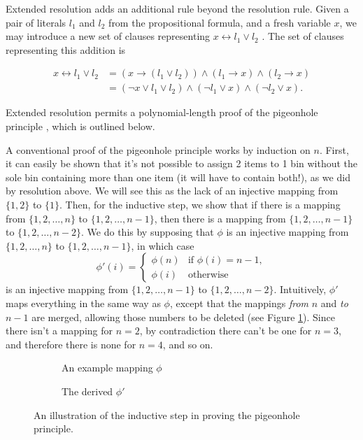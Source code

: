 \documentclass[proof,pdftex,11pt,a4,titlepage]{article}
\begin{document}
Extended resolution adds an additional rule beyond the resolution rule. Given a pair of literals $l_1$ and $l_2$ from the propositional formula, and a fresh variable $x$, we may introduce a new set of clauses representing $x \leftrightarrow l_1 \vee l_2$ \cite{Tseitin:1983}. The set of clauses representing this addition is

\begin{equation*}
  \begin{align*}
    x \leftrightarrow l_1 \vee l_2 &= (x \to (l_1 \vee l_2)) \wedge (l_1 \to x) \wedge (l_2 \to x) \\
          &= (\neg x \vee l_1 \vee l_2) \wedge (\neg l_1 \vee x) \wedge (\neg l_2 \vee x).
  \end{align*}
\end{equation*}

Extended resolution permits a polynomial-length proof of the pigeonhole principle \cite{Cook:1976}, which is outlined below.

A conventional proof of the pigeonhole principle works by induction on $n$. First, it can easily be shown that it's not possible to assign 2 items to 1 bin without the sole bin containing more than one item (it will have to contain both!), as we did by resolution above. We will see this as the lack of an injective mapping from $\{1,2\}$ to $\{1\}$. Then, for the inductive step, we show that if there is a mapping from $\{1,2,\ldots,n\}$ to $\{1,2,\ldots,n-1\}$, then there is a mapping from $\{1,2,\ldots,n-1\}$ to $\{1,2,\ldots,n-2\}$. We do this by supposing that $\phi$ is an injective mapping from $\{1,2,\ldots,n\}$ to $\{1,2,\ldots,n-1\}$, in which case
\[\phi'(i) = \begin{cases}
\phi(n) & \mbox{if } \phi(i) = n-1, \\
\phi(i) & \mbox{otherwise}
\end{cases}\]
is an injective mapping from $\{1,2,\ldots,n-1\}$ to $\{1,2,\ldots,n-2\}$. Intuitively, $\phi'$ maps everything in the same way as $\phi$, except that the mappings \emph{from} $n$ and \emph{to} $n-1$ are merged, allowing those numbers to be deleted (see Figure \ref{fig:php-induction}). Since there isn't a mapping for $n=2$, by contradiction there can't be one for $n=3$, and therefore there is none for $n=4$, and so on.

\begin{figure}[h]
  \begin{subfigure}[H]{0.5\textwidth}
    
    \caption{An example mapping $\phi$}
  \end{subfigure}
  \begin{subfigure}[H]{0.5\textwidth}
    
    \caption{The derived $\phi'$}
  \end{subfigure}
  \caption{An illustration of the inductive step in proving the pigeonhole principle.}
  \label{fig:php-induction}
\end{figure}
\end{document}
